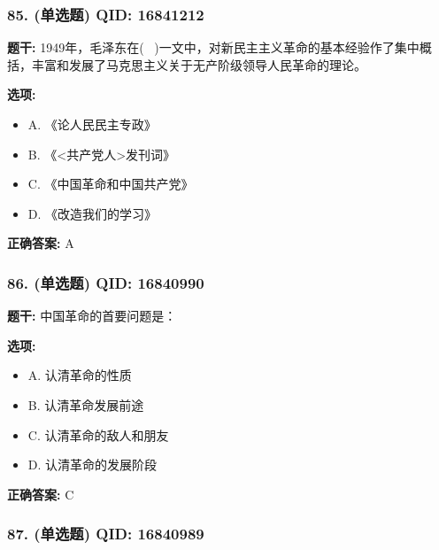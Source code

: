 \documentclass[12pt,UTF8]{ctexart}
\begin{document}
\subsubsection*{85. (单选题) \small QID: 16841212}

\textbf{题干:}
1949年，毛泽东在(  )一文中，对新民主主义革命的基本经验作了集中概括，丰富和发展了马克思主义关于无产阶级领导人民革命的理论。

\textbf{选项:}
\begin{itemize}[leftmargin=*]

  \item A. 《论人民民主专政》

  \item B. 《<共产党人>发刊词》

  \item C. 《中国革命和中国共产党》

  \item D. 《改造我们的学习》

\end{itemize}

\textbf{正确答案:}
A

\vspace{0.3em}\hrulefill\vspace{0.7em}

\subsubsection*{86. (单选题) \small QID: 16840990}

\textbf{题干:}
中国革命的首要问题是：

\textbf{选项:}
\begin{itemize}[leftmargin=*]

  \item A. 认清革命的性质

  \item B. 认清革命发展前途

  \item C. 认清革命的敌人和朋友

  \item D. 认清革命的发展阶段

\end{itemize}

\textbf{正确答案:}
C

\vspace{0.3em}\hrulefill\vspace{0.7em}

\subsubsection*{87. (单选题) \small QID: 16840989}
\end{document}
